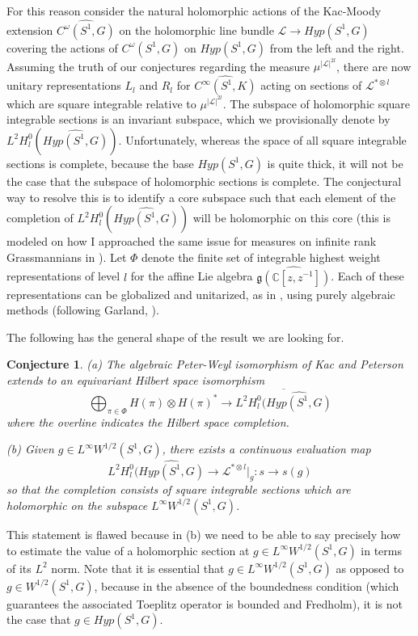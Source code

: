 \documentclass{amsart}
\theoremstyle{conjecture}
\newtheorem{conjecture}{Conjecture}
\theoremstyle{definition}
\theoremstyle{question}
\theoremstyle{questions}
\theoremstyle{remark}
\theoremstyle{remarks}
\theoremstyle{example}
\numberwithin{equation}{section}
\begin{document}
For this reason consider the natural holomorphic actions of the Kac-Moody extension
$\widehat{C^{\omega}(S^1,G)}$ on the holomorphic line bundle $\mathcal L \to Hyp(S^1,G)$ covering
the actions of $C^{\omega}(S^1,G)$ on $Hyp(S^1,G)$ from the left and the right. Assuming the truth of our conjectures
regarding the measure $\mu^{|\mathcal L|^{2l}}$, there are now unitary representations $L_l$ and $R_l$ for $\widehat{C^{\infty}(S^1,K)}$ acting on sections of $\mathcal L^{*\otimes l}$ which are square integrable relative to $\mu^{|\mathcal L|^{2l}}$.   The subspace of holomorphic square integrable sections is an invariant subspace, which we provisionally denote by $L^2H^0_l(\widehat{Hyp(S^1,G)})$. Unfortunately, whereas the space of all square integrable sections is complete, because the base $Hyp(S^1,G)$ is quite thick, it will not be the case that the subspace of holomorphic sections is complete. The conjectural way to resolve this is to identify a core subspace such that
each element of the completion of $L^2H^0_l(\widehat{Hyp(S^1,G)})$ will be holomorphic on this core (this is modeled on how I approached the same issue for measures on infinite rank Grassmannians in \cite{Pi1}). Let $\Phi$ denote the finite set of integrable highest weight representations of level $l$ for the affine Lie algebra $\widehat{\mathfrak g(\mathbb C[z,z^{-1}])}$. Each of these representations can be globalized and unitarized, as in \cite{PS}, using purely algebraic methods (following Garland, \cite{Garland}).

The following has the general shape of the result we are looking for.

\begin{conjecture}\label{Peter-Weyl} (a) The algebraic Peter-Weyl isomorphism of Kac and Peterson extends to an
equivariant Hilbert space isomorphism
$$\bigoplus_{\pi\in\Phi} H(\pi)\otimes H(\pi)^* \to \overline{L^2H^0_l(\widehat{Hyp(S^1,G)}} $$
where the overline indicates the Hilbert space completion.

(b) Given $g\in L^{\infty}W^{1/2}(S^1,G)$, there exists a continuous evaluation map
$$L^2H^0_l(\widehat{Hyp(S^1,G)}\to \mathcal L^{*\otimes l}|_g:s \to s(g)$$
so that the completion consists of square integrable sections which are holomorphic
on the subspace $L^{\infty}W^{1/2}(S^1,G)$.
\end{conjecture}


This statement is flawed because in (b) we need to be able to say precisely how to estimate the value of
a holomorphic section at $g\in L^{\infty}W^{1/2}(S^1,G)$ in terms of its $L^2$ norm. Note that it is essential that $g\in L^{\infty}W^{1/2}(S^1,G)$ as opposed to $g\in W^{1/2}(S^1,G)$, because in the absence of the boundedness condition (which guarantees the associated Toeplitz operator is bounded and Fredholm), it is not the case that $g\in Hyp(S^1,G)$.
\end{document}
